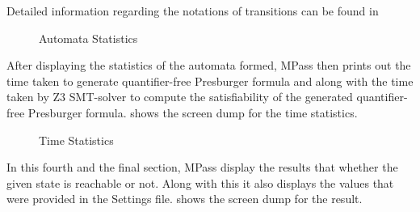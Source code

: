 Detailed information regarding the notations of transitions can be found in \cite{AAC13}
\begin{figure}[H]
  \begin{center}
  \end{center}
\caption{Automata Statistics}\label{fig:data}
\end{figure}
After displaying the statistics of the automata formed, MPass then prints out the time taken to generate quantifier-free Presburger formula and along with the time taken by Z3 SMT-solver to compute the satisfiability of the generated quantifier-free Presburger formula.  shows the screen dump for the time statistics.
\begin{figure}[H]
  \begin{center}
  \end{center}
\caption{Time Statistics}\label{fig:time}
\end{figure}
In this fourth and the final section, MPass display the results that whether the given state is reachable or not. Along with this it also displays the values that were provided in the Settings file.  shows the screen dump for the result.
